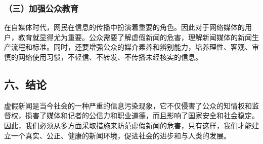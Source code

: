 ﻿\documentclass{ctexart}
\begin{document}
\subsubsection*{\quad \quad（三）加强公众教育}
在自媒体时代，网民在信息的传播中扮演着重要的角色。因此对于网络媒体的用户，教育就显得尤为重要。公众需要了解虚假新闻的危害，理解新闻媒体的新闻生产流程和标准。同时，还要增强公众的媒介素养和辨别能力，培养理性、客观、审慎的网络使用习惯，不轻信、不转发、不传播未经核实的信息。
\subsection*{\textbf{六、结论}}
虚假新闻是当今社会的一种严重的信息污染现象，它不仅侵害了公众的知情权和监督权，损害了媒体和记者的公信力和职业道德，而且影响了国家安全和社会稳定。因此，我们必须从多方面采取措施来防范虚假新闻的危害，只有这样，我们才能建立一个真实、公正、健康的新闻环境，促进社会的进步和与人类的发展。
\end{document}
